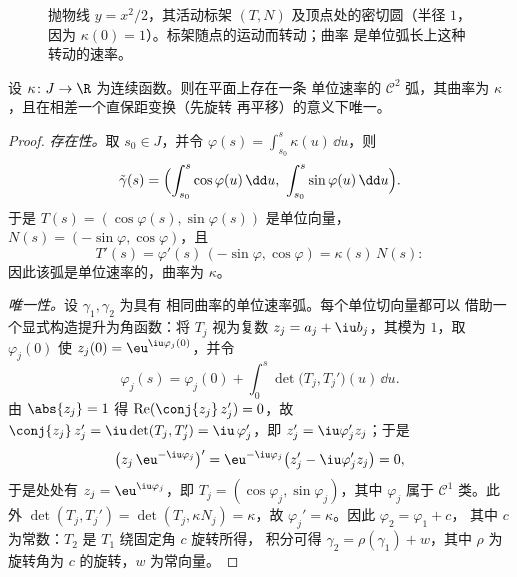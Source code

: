 \begin{figure}[ht]
\centering
{}
\caption{抛物线 $y = x^2/2$，其活动标架 $(T,
N)$ 及顶点处的密切圆（半径 $1$，因为
$\kappa(0) = 1$）。标架随点的运动而转动；曲率
是单位弧长上这种转动的速率。}
\label{fig:b2:curves:osculating}
\end{figure}

\begin{theorem}[曲线由曲率决定]\label{thm:b2:curves:fundamental}
设 $\kappa \colon J \to \R$ 为连续函数。则在平面上存在一条
单位速率的 $\mathcal{C}^2$ 弧，其曲率为
$\kappa$，且在相差一个直保距变换（先旋转
再平移）的意义下唯一。
\end{theorem}

\begin{proof}
\emph{存在性。}取 $s_0 \in J$，并令 $\varphi(s) =
\int_{s_0}^s \kappa(u)\,\dd u$，则
\[
\tilde\gamma(s) = \Bigl(\int_{s_0}^s \cos\varphi(u)\,\dd u,\
\int_{s_0}^s \sin\varphi(u)\,\dd u\Bigr).
\]
于是 $T(s) = (\cos\varphi(s), \sin\varphi(s))$ 是单位向量，
$N(s) = (-\sin\varphi, \cos\varphi)$，且
\[
T'(s) = \varphi'(s)\,(-\sin\varphi, \cos\varphi)
= \kappa(s)\,N(s) :
\]
因此该弧是单位速率的，曲率为 $\kappa$。

\emph{唯一性。}设 $\gamma_1, \gamma_2$ 为具有
相同曲率的单位速率弧。每个单位切向量都可以
借助一个显式构造提升为角函数：将 $T_j$ 视为复数
$z_j = a_j + \iu b_j$，其模为 $1$，取
$\varphi_j(0)$ 使 $z_j(0) = \eu^{\iu\varphi_j(0)}$，并令
\[
\varphi_j(s) = \varphi_j(0) + \int_0^s\det\bigl(T_j,
T_j'\bigr)(u)\,\dd u .
\]
由 $\abs{z_j} = 1$ 得 $\operatorname{Re}(\conj{z_j}\,z_j') =
0$，故 $\conj{z_j}\,z_j' = \iu\det(T_j, T_j') =
\iu\,\varphi_j'$，即 $z_j' = \iu\varphi_j'z_j$；于是
\[
\bigl(z_j\,\eu^{-\iu\varphi_j}\bigr)'
= \eu^{-\iu\varphi_j}\bigl(z_j' - \iu\varphi_j'z_j\bigr) = 0,
\]
于是处处有 $z_j = \eu^{\iu\varphi_j}$，即 $T_j =
(\cos\varphi_j, \sin\varphi_j)$，其中 $\varphi_j$ 属于
$\mathcal C^1$ 类。此外 $\det(T_j, T_j') = \det(T_j,
\kappa N_j) = \kappa$，故 $\varphi_j' = \kappa$。因此 $\varphi_2 = \varphi_1 + c$，
其中 $c$ 为常数：$T_2$ 是 $T_1$ 绕固定角 $c$ 旋转所得，
积分可得 $\gamma_2 = \rho(\gamma_1) + w$，其中 $\rho$ 为
旋转角为 $c$ 的旋转，$w$ 为常向量。
\end{proof}

